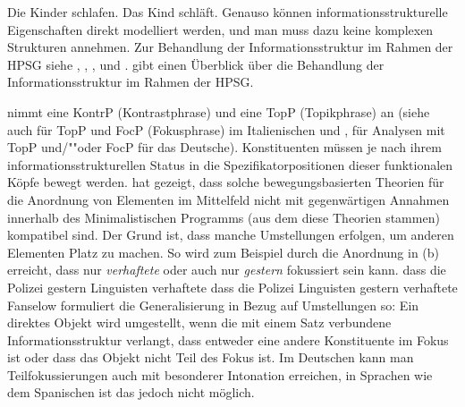 \eal
\ex Die Kinder schlafen.
\ex Das Kind schläft.
\zl
Genauso können informationsstrukturelle Eigenschaften direkt modelliert
werden, und man muss dazu keine komplexen Strukturen annehmen. Zur Behandlung der
Informationsstruktur im Rahmen der HPSG siehe , ,
,  
und . \citet{DeKuthyInformationStructureHandbook} gibt einen Überblick über die Behandlung der
Informationsstruktur im Rahmen der HPSG.%



\mbox{}\citet{Frey2004a} nimmt eine KontrP (Kontrastphrase) und 
\citet{Frey2004b-u}
eine TopP (Topikphrase) an (siehe auch  für TopP und FocP (Fokusphrase) im Italienischen und 
,  für Analysen mit TopP und/""oder FocP für das Deutsche).
Konstituenten müssen je nach ihrem informationsstrukturellen Status in die Spezifikatorpositionen
dieser funktionalen Köpfe bewegt werden. \citet{Fanselow2003b} hat gezeigt, dass solche bewegungsbasierten
Theorien für die Anordnung von Elementen im Mittelfeld nicht mit gegenwärtigen Annahmen innerhalb
des Minimalistischen Programms (aus dem diese Theorien stammen) kompatibel sind. Der Grund ist,
dass manche Umstellungen erfolgen, um anderen Elementen Platz zu machen. So wird zum Beispiel
durch die Anordnung in (b) erreicht, dass nur \emph{verhaftete} oder auch nur \emph{gestern}
fokussiert sein kann.
\eal
\ex dass die Polizei gestern Linguisten verhaftete
\ex dass die Polizei Linguisten gestern verhaftete
\zl
Fanselow formuliert die Generalisierung in Bezug auf Umstellungen so: Ein direktes Objekt wird
umgestellt, wenn die mit einem Satz verbundene Informationsstruktur verlangt, dass entweder
eine andere Konstituente im Fokus ist oder dass das Objekt nicht Teil des Fokus ist. Im Deutschen
kann man Teilfokussierungen auch mit besonderer Intonation erreichen, in Sprachen wie dem Spanischen
ist das jedoch nicht möglich.

